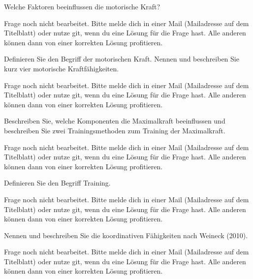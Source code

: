 \begin{question}{4}
    Welche Faktoren beeinflussen die motorische Kraft?
\end{question}
\begin{solution}
    Frage noch nicht bearbeitet. Bitte melde dich in einer Mail (Mailadresse auf dem Titelblatt) oder nutze git, wenn du eine Lösung für die Frage hast. Alle anderen können dann von einer korrekten Lösung profitieren.
\end{solution}

\begin{question}{6}
    Definieren Sie den Begriff der motorischen Kraft. Nennen und beschreiben Sie kurz vier motorische Kraftfähigkeiten.
\end{question}
\begin{solution}
    Frage noch nicht bearbeitet. Bitte melde dich in einer Mail (Mailadresse auf dem Titelblatt) oder nutze git, wenn du eine Lösung für die Frage hast. Alle anderen können dann von einer korrekten Lösung profitieren.
\end{solution}

\begin{question}{6}
    Beschreiben Sie, welche Komponenten die Maximalkraft beeinflussen und beschreiben Sie zwei Trainingsmethoden zum Training der Maximalkraft.
\end{question}
\begin{solution}
    Frage noch nicht bearbeitet. Bitte melde dich in einer Mail (Mailadresse auf dem Titelblatt) oder nutze git, wenn du eine Lösung für die Frage hast. Alle anderen können dann von einer korrekten Lösung profitieren.
\end{solution}

\begin{question}{2}
    Definieren Sie den Begriff Training.
\end{question}
\begin{solution}
    Frage noch nicht bearbeitet. Bitte melde dich in einer Mail (Mailadresse auf dem Titelblatt) oder nutze git, wenn du eine Lösung für die Frage hast. Alle anderen können dann von einer korrekten Lösung profitieren.
\end{solution}

\begin{question}{7}
    Nennen und beschreiben Sie die koordinativen Fähigkeiten nach Weineck (2010).
\end{question}
\begin{solution}
    Frage noch nicht bearbeitet. Bitte melde dich in einer Mail (Mailadresse auf dem Titelblatt) oder nutze git, wenn du eine Lösung für die Frage hast. Alle anderen können dann von einer korrekten Lösung profitieren.
\end{solution}

